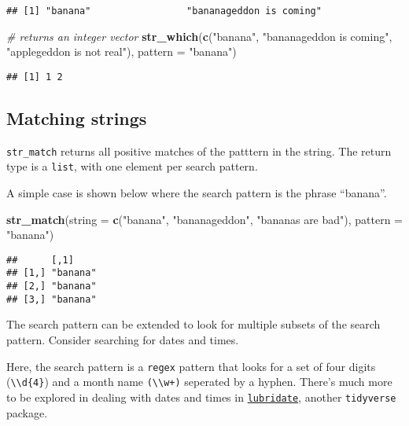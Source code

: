 \documentclass[
]{book}
\newenvironment{Shaded}{}{}
\newcommand{\CommentTok}[1]{\textcolor[rgb]{0.38,0.63,0.69}{\textit{#1}}}
\newcommand{\DataTypeTok}[1]{\textcolor[rgb]{0.56,0.13,0.00}{#1}}
\newcommand{\KeywordTok}[1]{\textcolor[rgb]{0.00,0.44,0.13}{\textbf{#1}}}
\newcommand{\NormalTok}[1]{#1}
\newcommand{\StringTok}[1]{\textcolor[rgb]{0.25,0.44,0.63}{#1}}
\begin{document}
\begin{verbatim}
## [1] "banana"                 "bananageddon is coming"
\end{verbatim}

\begin{Shaded}
\begin{Highlighting}[]
\CommentTok{# returns an integer vector}
\KeywordTok{str_which}\NormalTok{(}\KeywordTok{c}\NormalTok{(}\StringTok{"banana"}\NormalTok{,}
            \StringTok{"bananageddon is coming"}\NormalTok{,}
            \StringTok{"applegeddon is not real"}\NormalTok{),}
          \DataTypeTok{pattern =} \StringTok{"banana"}\NormalTok{)}
\end{Highlighting}
\end{Shaded}

\begin{verbatim}
## [1] 1 2
\end{verbatim}

\hypertarget{matching-strings}{%
\subsection{Matching strings}\label{matching-strings}}

\texttt{str\_match} returns all positive matches of the patttern in the string.
The return type is a \texttt{list}, with one element per search pattern.

A simple case is shown below where the search pattern is the phrase ``banana''.

\begin{Shaded}
\begin{Highlighting}[]
\KeywordTok{str_match}\NormalTok{(}\DataTypeTok{string =} \KeywordTok{c}\NormalTok{(}\StringTok{"banana"}\NormalTok{,}
                     \StringTok{"bananageddon"}\NormalTok{,}
                     \StringTok{"bananas are bad"}\NormalTok{),}
          \DataTypeTok{pattern =} \StringTok{"banana"}\NormalTok{)}
\end{Highlighting}
\end{Shaded}

\begin{verbatim}
##      [,1]    
## [1,] "banana"
## [2,] "banana"
## [3,] "banana"
\end{verbatim}

The search pattern can be extended to look for multiple subsets of the search pattern. Consider searching for dates and times.

Here, the search pattern is a \texttt{regex} pattern that looks for a set of four digits (\texttt{\textbackslash{}\textbackslash{}d\{4\}}) and a month name \texttt{(\textbackslash{}\textbackslash{}w+)} seperated by a hyphen. There's much more to be explored in dealing with dates and times in \href{https://lubridate.tidyverse.org/}{\texttt{lubridate}}, another \texttt{tidyverse} package.
\end{document}
